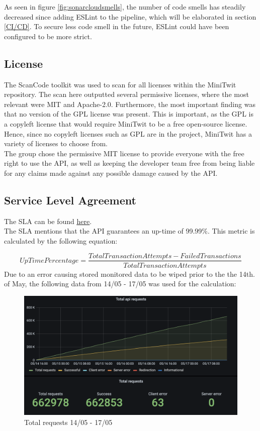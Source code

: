 \noindent
As seen in figure \ref{fig:sonarcloudsmells}, the number of code smells has steadily decreased since adding ESLint to the pipeline, which will be elaborated in section \ref{CI/CD}. To secure less code smell in the future, ESLint could have been configured to be more strict. 



\subsection{License}
The ScanCode toolkit\cite{scancode} was used to scan for all licenses within the MiniTwit repository. The scan here outputted several permissive licenses, where the most relevant were MIT and Apache-2.0. Furthermore, the most important finding was that no version of the GPL license was present. This is important, as the GPL is a copyleft license that would require MiniTwit to be a free open-source license\cite{gpl}. Hence, since no copyleft licenses such as GPL are in the project, MiniTwit has a variety of licenses to choose from.\\
The group chose the permissive MIT license to provide everyone with the free right to use the API, as well as keeping the developer team free from being liable for any claims made against any possible damage caused by the API.

\subsection{Service Level Agreement}
The SLA can be found  \href{https://github.com/Niels-Frederik/MiniTwit/blob/main/API/SLA.md}{\underline{here}}.
\\
The SLA mentions that the API guarantees an up-time of 99.99\%. This metric is calculated by the following equation:

\[
    UpTimePercentage = \frac{Total Transaction Attempts - Failed Transactions}{Total Transaction Attempts}
\]
Due to an error causing stored monitored data to be wiped prior to the the 14th. of May, the following data from 14/05 - 17/05 was used for the calculation:\\
\begin{figure}[H]
    \centering
    \includegraphics[width=0.90\linewidth]{report/images/sla_metrics.png}
    \caption{Total requests 14/05 - 17/05}
    \label{fig:totalrequests}
\end{figure}

